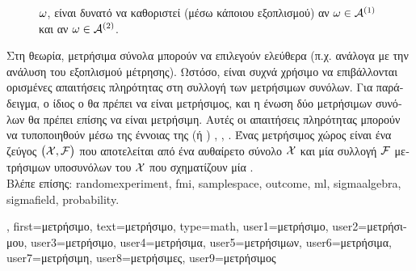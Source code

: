 {{\begin{figure}[H]
{{{			$\omega$, είναι δυνατό να καθοριστεί (μέσω κάποιου εξοπλισμού) αν 
			$\omega \in \mathcal{A}^{(1)}$ και αν} $\omega \in \mathcal{A}^{(2)}$. 
			\label{fig_measurable_dict}} }
		\end{figure}
		\foreignlanguage{greek}{Στη θεωρία, μετρήσιμα σύνολα μπορούν να επιλεγούν ελεύθερα (π.χ. ανάλογα με την ανάλυση 
		του εξοπλισμού μέτρησης). Ωστόσο, είναι συχνά χρήσιμο να επιβάλλονται ορισμένες απαιτήσεις πληρότητας στη συλλογή 
		των μετρήσιμων συνόλων. Για παράδειγμα, ο ίδιος ο}  \foreignlanguage{greek}{θα πρέπει να είναι 
		μετρήσιμος, και η ένωση δύο μετρήσιμων συνόλων θα πρέπει επίσης να είναι μετρήσιμη. Αυτές οι απαιτήσεις πληρότητας
		μπορούν να τυποποιηθούν μέσω της έννοιας της}  (\foreignlanguage{greek}{ή} ) 
		\cite{RudinBook}, \cite{BillingsleyProbMeasure}, \cite{durrett2010probability}. 
		\foreignlanguage{greek}{Ένας μετρήσιμος χώρος είναι ένα ζεύγος $\big(\mathcal{X},\mathcal{F}\big)$ που αποτελείται από ένα 
		αυθαίρετο σύνολο $\mathcal{X}$ και μία συλλογή $\mathcal{F}$ μετρήσιμων υποσυνόλων του $\mathcal{X}$ 
		που σχηματίζουν μία} . 
		\\
		\foreignlanguage{greek}{Βλέπε επίσης:} \gls{randomexperiment}, \gls{fmi}, \gls{samplespace}, \gls{outcome}, \gls{ml}, 
		\gls{sigmaalgebra}, \gls{sigmafield}, \gls{probability}.},
	first={\foreignlanguage{greek}{μετρήσιμο}},
	text={\foreignlanguage{greek}{μετρήσιμο}},
	type=math,
	user1={\foreignlanguage{greek}{μετρήσιμο}}, %
  	user2={\foreignlanguage{greek}{μετρήσιμου}}, %
	user3={\foreignlanguage{greek}{μετρήσιμο}}, %
	user4={\foreignlanguage{greek}{μετρήσιμα}}, %
  	user5={\foreignlanguage{greek}{μετρήσιμων}}, %
	user6={\foreignlanguage{greek}{μετρήσιμα}}, %
	user7={\foreignlanguage{greek}{μετρήσιμη}}, %
	user8={\foreignlanguage{greek}{μετρήσιμες}}, %
	user9={\foreignlanguage{greek}{μετρήσιμος}} %
}


